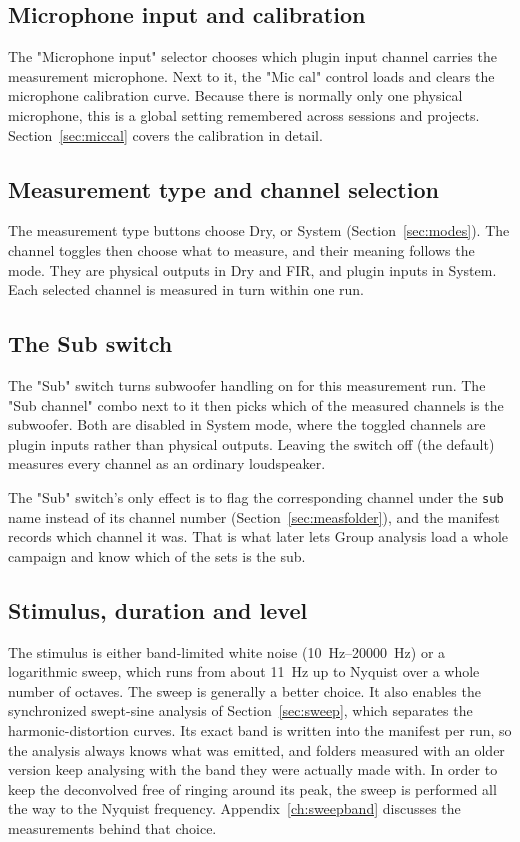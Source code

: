 \subsection{Microphone input and calibration}
The "Microphone input" selector chooses which plugin input channel carries the measurement microphone. Next to it, the "Mic cal" control loads and clears the microphone calibration curve. Because there is normally only one physical microphone, this is a global setting remembered across sessions and projects. Section~\ref{sec:miccal} covers the calibration in detail.

\subsection{Measurement type and channel selection}
The measurement type buttons choose Dry,  or System (Section~\ref{sec:modes}). The channel toggles then choose what to measure, and their meaning follows the mode. They are physical outputs in Dry and FIR, and plugin inputs in System. Each selected channel is measured in turn within one run.

\subsection{The Sub switch}
The "Sub" switch turns subwoofer handling on for this measurement run. The "Sub channel" combo next to it then picks which of the measured channels is the subwoofer. Both are disabled in System mode, where the toggled channels are plugin inputs rather than physical outputs. Leaving the switch off (the default) measures every channel as an ordinary loudspeaker.

The "Sub" switch's only effect is to flag the corresponding channel under the \texttt{sub} name instead of its channel number (Section~\ref{sec:measfolder}), and the manifest records which channel it was. That is what later lets Group analysis load a whole campaign and know which of the sets is the sub.

\subsection{Stimulus, duration and level}
The stimulus is either band-limited white noise (\SIrange{10}{20000}{\hertz}) or a logarithmic sweep, which runs from about \SI{11}{\hertz} up to Nyquist over a whole number of octaves. The sweep is generally a better choice. It also enables the synchronized swept-sine analysis of Section~\ref{sec:sweep}, which separates the harmonic-distortion curves. Its exact band is written into the manifest per run, so the analysis always knows what was emitted, and folders measured with an older version keep analysing with the band they were actually made with. In order to keep the deconvolved  free of ringing around its peak, the sweep is performed all the way to the Nyquist frequency. Appendix~\ref{ch:sweepband} discusses the measurements behind that choice.

